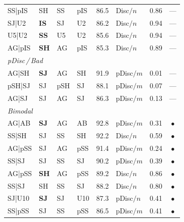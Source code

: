 \begin{table}[!ht]
\begin{tabular}{@{}llllrllc@{}}
SS|pIS & SH & SS & pIS & 86.5 & Disc$/n$ & 0.86 & --- \\
SJ|U2 & \textbf{IS} & SJ & U2 & 86.2 & Disc$/n$ & 0.94 & --- \\
U5|U2 & \textbf{SS} & U5 & U2 & 85.6 & Disc$/n$ & 0.94 & --- \\
AG|pIS & \textbf{SH} & AG & pIS & 85.3 & Disc$/n$ & 0.89 & --- \\
\midrule
\multicolumn{8}{l}{\textit{pDisc\,/\,Bad}} \\
\midrule
AG|SH & \textbf{SJ} & AG & SH & 91.9 & pDisc$/m$ & 0.01 & --- \\
pSH|SJ & SJ & pSH & SJ & 88.1 & pDisc$/m$ & 0.07 & --- \\
AG|SJ & SJ & AG & SJ & 86.3 & pDisc$/m$ & 0.13 & --- \\
\midrule
\multicolumn{8}{l}{\textit{Bimodal}} \\
\midrule
AG|AB & \textbf{SJ} & AG & AB & 92.8 & pDisc$/m$ & 0.31 & $\bullet$ \\
SS|SH & SJ & SS & SH & 92.2 & Disc$/n$ & 0.59 & $\bullet$ \\
AG|pSS & SJ & AG & pSS & 91.4 & pDisc$/m$ & 0.24 & $\bullet$ \\
SS|SJ & SJ & SS & SJ & 90.2 & pDisc$/m$ & 0.39 & $\bullet$ \\
AG|pSS & \textbf{SH} & AG & pSS & 89.2 & Disc$/n$ & 0.86 & $\bullet$ \\
SS|SJ & SH & SS & SJ & 88.2 & Disc$/n$ & 0.80 & $\bullet$ \\
SJ|U10 & \textbf{SJ} & SJ & U10 & 87.3 & pDisc$/n$ & 0.41 & $\bullet$ \\
SS|pSS & SJ & SS & pSS & 86.5 & pDisc$/m$ & 0.41 & $\bullet$ \\
\bottomrule
\end{tabular}
\end{table}